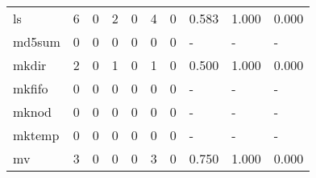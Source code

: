 \begin{longtable}{lp{2.0cm}p{2.0cm}p{2.0cm}p{2.0cm}p{2.0cm}p{2.0cm}p{2.0cm}p{2.0cm}p{2.0cm}}
ls        &                      6 &                                             0 &                                            2 &                                           0 &                                            4 &                                          0 &                                0.583 &                                  1.000 &                                0.000 \\
md5sum    &                      0 &                                             0 &                                            0 &                                           0 &                                            0 &                                          0 &                                    - &                                      - &                                    - \\
mkdir     &                      2 &                                             0 &                                            1 &                                           0 &                                            1 &                                          0 &                                0.500 &                                  1.000 &                                0.000 \\
mkfifo    &                      0 &                                             0 &                                            0 &                                           0 &                                            0 &                                          0 &                                    - &                                      - &                                    - \\
mknod     &                      0 &                                             0 &                                            0 &                                           0 &                                            0 &                                          0 &                                    - &                                      - &                                    - \\
mktemp    &                      0 &                                             0 &                                            0 &                                           0 &                                            0 &                                          0 &                                    - &                                      - &                                    - \\
mv        &                      3 &                                             0 &                                            0 &                                           0 &                                            3 &                                          0 &                                0.750 &                                  1.000 &                                0.000 \\

\end{longtable}
